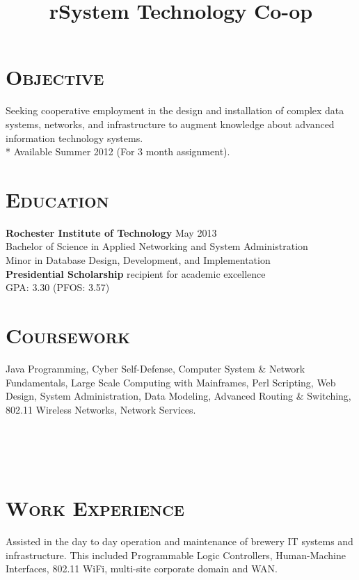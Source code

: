 \begin{resume}


\section{\textsc{Objective}}
Seeking cooperative employment in the design and installation of complex data systems, networks, and infrastructure to augment knowledge about advanced information technology systems. \\*
Available Summer 2012 (For 3 month assignment).
\section{\textsc{Education}}

\textbf{Rochester Institute of Technology} \hfill May 2013 \\
Bachelor of Science in Applied Networking and System Administration \\
Minor in Database Design, Development, and Implementation \\
{\bf Presidential Scholarship} recipient for academic excellence \\
GPA: 3.30 (PFOS: 3.57)

\section{\textsc{Coursework}}

Java Programming, Cyber Self-Defense, Computer System \& Network Fundamentals, Large Scale Computing with Mainframes, Perl Scripting, Web Design, System Administration, Data Modeling, Advanced Routing \& Switching, 802.11 Wireless Networks, Network Services.

\begin{formatb}
  \title{r}\\
  \\
  \body\\
\end{formatb}

\section{\textsc{Work Experience}}

\title{System Technology Co-op}
\begin{position}
Assisted in the day to day operation and maintenance of brewery IT systems and infrastructure. This included Programmable Logic Controllers, Human-Machine Interfaces, 802.11 WiFi, multi-site corporate domain and WAN.
\end{position}


\end{resume}
